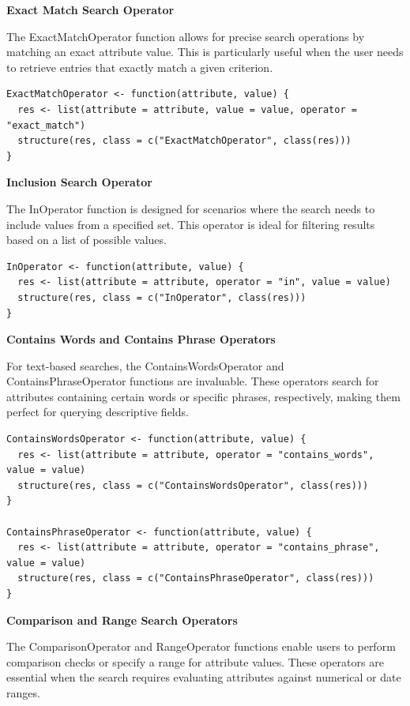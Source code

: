 \textbf{Exact Match Search Operator}

The ExactMatchOperator function allows for precise search operations by matching an exact attribute value. This is particularly useful when the user needs to retrieve entries that exactly match a given criterion.

\begin{verbatim}
ExactMatchOperator <- function(attribute, value) {
  res <- list(attribute = attribute, value = value, operator = "exact_match")
  structure(res, class = c("ExactMatchOperator", class(res)))
}
\end{verbatim}

\textbf{Inclusion Search Operator}

The InOperator function is designed for scenarios where the search needs to include values from a specified set. This operator is ideal for filtering results based on a list of possible values.

\begin{verbatim}
InOperator <- function(attribute, value) {
  res <- list(attribute = attribute, operator = "in", value = value)
  structure(res, class = c("InOperator", class(res)))
}
\end{verbatim}

\textbf{Contains Words and Contains Phrase Operators}

For text-based searches, the ContainsWordsOperator and ContainsPhraseOperator functions are invaluable. These operators search for attributes containing certain words or specific phrases, respectively, making them perfect for querying descriptive fields.

\begin{verbatim}
ContainsWordsOperator <- function(attribute, value) {
  res <- list(attribute = attribute, operator = "contains_words", value = value)
  structure(res, class = c("ContainsWordsOperator", class(res)))
}

ContainsPhraseOperator <- function(attribute, value) {
  res <- list(attribute = attribute, operator = "contains_phrase", value = value)
  structure(res, class = c("ContainsPhraseOperator", class(res)))
}
\end{verbatim}

\textbf{Comparison and Range Search Operators}

The ComparisonOperator and RangeOperator functions enable users to perform comparison checks or specify a range for attribute values. These operators are essential when the search requires evaluating attributes against numerical or date ranges.

